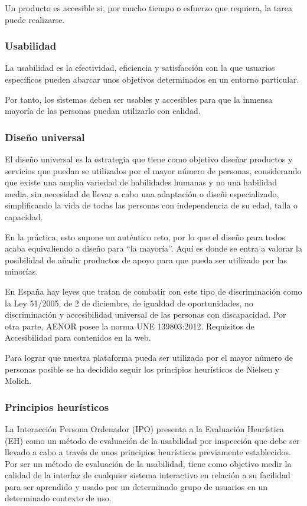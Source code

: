 Un producto es accesible si, por mucho tiempo o esfuerzo que requiera, la tarea puede realizarse.


\subsubsection{Usabilidad}
La usabilidad es la efectividad, eficiencia y satisfacción con la que usuarios específicos pueden abarcar unos objetivos determinados en un entorno particular\cite{iso_ergonomics}.


Por tanto, los sistemas deben ser usables y accesibles para que la inmensa mayoría de las personas puedan utilizarlo con calidad.


\subsubsection{Diseño universal}
El diseño universal es la estrategia que tiene como objetivo diseñar productos y servicios que puedan se utilizados por el mayor número de personas, considerando que existe una amplia variedad de habilidades humanas y no una habilidad media, sin necesidad de llevar a cabo una adaptación o diseñi especializado, simplificando la vida de todas las personas con independencia de su edad, talla o capacidad\cite{ekberg}.


En la práctica, esto supone un auténtico reto, por lo que el diseño para todos acaba equivaliendo a diseño para ``la mayoría''. Aquí es donde se entra a valorar la posibilidad de añadir productos de apoyo para que pueda ser utilizado por las minorías.


En España hay leyes que tratan de combatir con este tipo de discriminación como la Ley 51/2005, de 2 de diciembre, de igualdad de oportunidades, no discriminación y accesibilidad universal de las personas con discapacidad. Por otra parte, AENOR posee la norma UNE 139803:2012. Requisitos de Accesibilidad para contenidos en la web\cite{aenor_req_acces}.


Para lograr que nuestra plataforma pueda ser utilizada por el mayor número de personas posible se ha decidido seguir los principios heurísticos de Nielsen y Molich.


\subsubsection{Principios heurísticos}
La Interacción Persona Ordenador (IPO) presenta a la Evaluación Heurística (EH) como un método de evaluación de la usabilidad por inspección que debe ser llevado a cabo a través de unos principios heurísticos previamente establecidos. Por ser un método de evaluación de la usabilidad, tiene como objetivo medir la calidad de la interfaz de cualquier sistema interactivo en relación a su facilidad para ser aprendido y usado por un determinado grupo de usuarios en un determinado contexto de uso.


